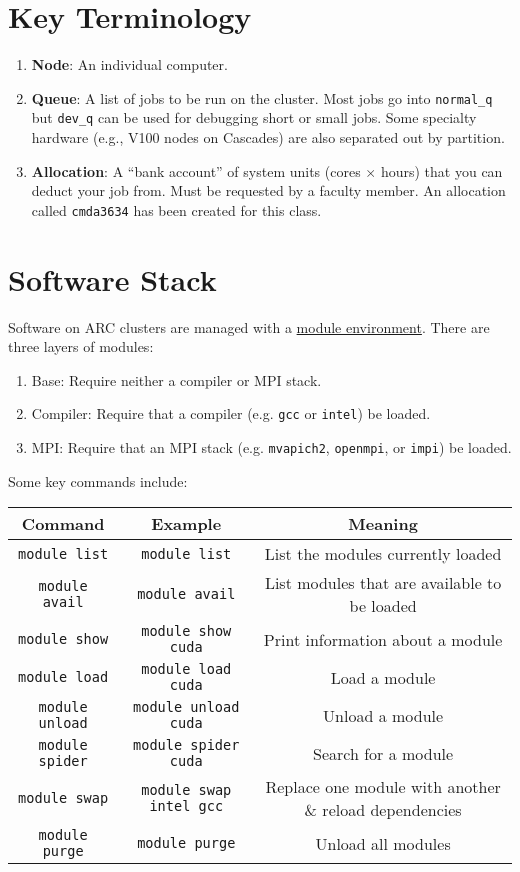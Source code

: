 \section{Key Terminology}
\begin{enumerate}
  \item \textbf{Node}: An individual computer.
  \item \textbf{Queue}: A list of jobs to be run on the cluster. Most jobs go into \texttt{normal\_q} but \texttt{dev\_q} can be used for debugging short or small jobs. Some specialty hardware (e.g., V100 nodes on Cascades) are also separated out by partition.
  \item \textbf{Allocation}: A ``bank account'' of system units (cores $\times$ hours) that you can deduct your job from. Must be requested by a faculty member. An allocation called \texttt{cmda3634} has been created for this class.
\end{enumerate}

\section{Software Stack}
Software on ARC clusters are managed with a \href{http://www.arc.vt.edu/modules}{module environment}. There are three layers of modules:
\begin{enumerate}
	\item Base: Require neither a compiler or MPI stack.
	\item Compiler: Require that a compiler (e.g. \texttt{gcc} or \texttt{intel}) be loaded.
	\item MPI: Require that an MPI stack (e.g. \texttt{mvapich2}, \texttt{openmpi}, or \texttt{impi}) be loaded.
\end{enumerate}
Some key commands include:
\begin{table}[h]
\centering
\begin{tabular}{ c | c | c } \hline
   Command & Example & Meaning \\
  \hline    \hline
  \texttt{module list} & \texttt{module list} & List the modules currently loaded \\
  \texttt{module avail} & \texttt{module avail} & List modules that are available to be loaded \\
  \texttt{module show} & \texttt{module show cuda} & Print information about a module \\
  \texttt{module load} & \texttt{module load cuda} & Load a module \\
  \texttt{module unload} & \texttt{module unload cuda} & Unload a module \\
  \texttt{module spider} & \texttt{module spider cuda} & Search for a module \\
  \texttt{module swap} & \texttt{module swap intel gcc} & Replace one module with another \& reload dependencies \\
  \texttt{module purge} & \texttt{module purge} & Unload all modules \\ \hline
\end{tabular}
\end{table}

